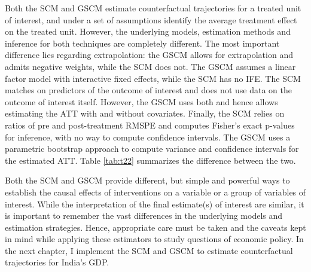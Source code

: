 \documentclass[12pt,nobind, a4paper]{reedthesis}
\begin{document}
 Both the SCM and GSCM estimate counterfactual trajectories for a treated unit of interest, and under a set of assumptions identify the average treatment effect on the treated unit. However, the underlying models, estimation methods and inference for both techniques are completely different. The most important difference lies regarding extrapolation: the GSCM allows for extrapolation and admits negative weights, while the SCM does not. The GSCM assumes a linear factor model with interactive fixed effects, while the SCM has no IFE. The SCM matches on predictors of the outcome of interest and does not use data on the outcome of interest itself. However, the GSCM uses both and hence allows estimating the ATT with and without covariates. Finally, the SCM relies on ratios of pre and post-treatment RMSPE and computes Fisher's exact p-values for inference, with no way to compute confidence intervals. The GSCM uses a parametric bootstrap approach to compute variance and confidence intervals for the estimated ATT. Table \ref{tab:t22} summarizes the difference between the two.
 \begin{table}[h!!]
 \centering
 \caption{Differences between the SCM and GSCM Estimators.}
 \label{tab:t22}
 \end{table}
 \linebreak

 Both the SCM and GSCM provide different, but simple and powerful ways to establish the causal effects of interventions on a variable or a group of variables of interest. While the interpretation of the final estimate(s) of interest are similar, it is important to remember the vast differences in the underlying models and estimation strategies. Hence, appropriate care must be taken and the caveats kept in mind while applying these estimators to study questions of economic policy. In the next chapter, I implement the SCM and GSCM to estimate counterfactual trajectories for India's GDP.
\end{document}
